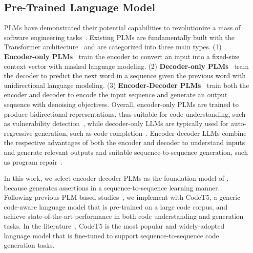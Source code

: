 \subsection{Pre-Trained Language Model}
\label{sec_background_LLM}

PLMs have demonstrated their potential capabilities to revolutionize a mass of software engineering tasks~\cite{wang2024software,fan2023large,tufano2022using, li2022automating,zhang2024systematic,zhang2023survey2}.
Existing PLMs are fundamentally built with the Transformer architecture~\cite{vaswani2017attention} and are categorized into three main types.
(1) \textbf{Encoder-only PLMs}~\cite{feng2020codebert,guo2020graphcodebert} train the encoder to convert an input into a fixed-size context vector with masked language modeling.
(2) \textbf{Decoder-only PLMs}~\cite{lu2021codexglue} train the decoder to predict the next word in a sequence given the previous word with unidirectional language modeling.
(3) \textbf{Encoder-Decoder PLMs}~\cite{wang2021codet5} train both the encoder and decoder to encode the input sequence and generate an output sequence with denoising objectives.
Overall, encoder-only PLMs are trained to produce bidirectional representations, thus suitable for code understanding, such as vulnerability detection~\cite{fu2022linevul}, while decoder-only LLMs are typically used for auto-regressive generation, such as code completion~\cite{ribeiro2022framing}.
Encoder-decoder LLMs combine the respective advantages of both the encoder and decoder to understand inputs and generate relevant outputs and suitable sequence-to-sequence generation, such as program repair~\cite{wang2023rap,yuan2022circle}.

In this work, we select encoder-decoder PLMs as the foundation model of \toolname{}, because \toolname{} generates assertions in a sequence-to-sequence learning manner.
Following previous PLM-based studies~\cite{wang2023rap,peng2024domain,fu2022vulrepair,zhang2023pre}, we implement \toolname{} with CodeT5, a generic code-aware language model that is pre-trained on a large code corpus, and achieve state-of-the-art performance in both code understanding and generation tasks.
In the literature~\cite{wang2024software}, CodeT5 is the most popular and widely-adopted language model that is fine-tuned to support sequence-to-sequence code generation tasks.


\subsection{}
\label{sec:background_IR}

